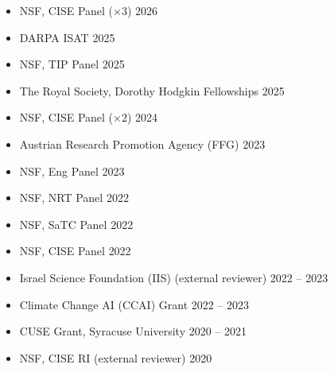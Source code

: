 \begin{itemize}
  \item NSF, CISE Panel \;($\times 3$) \hfill {2026}
  \item DARPA ISAT \hfill {2025}
  \item 
  NSF, TIP Panel \hfill {2025}%
  \item 
  The Royal Society, Dorothy Hodgkin Fellowships \hfill {2025}%
  \item 
  NSF, CISE Panel \;($\times 2$) \hfill {2024}%
  \item 
  Austrian Research Promotion Agency (FFG) \hfill {2023}
  \item 
  NSF, Eng Panel \hfill {2023}
  \item 
  NSF, NRT Panel \hfill {2022}
  \item 
  NSF, SaTC Panel \hfill {2022} %
  \item 
  NSF, CISE Panel \hfill {2022} %
  \item 
  Israel Science Foundation (IIS) (external reviewer) \hfill {2022 -- 2023}
  \item 
  Climate Change AI (CCAI) Grant \hfill {2022 -- 2023}
  \item 
  CUSE Grant, Syracuse University \hfill {2020 -- 2021}
  \item 
  NSF, CISE RI (external reviewer) \hfill {2020}
\end{itemize}
